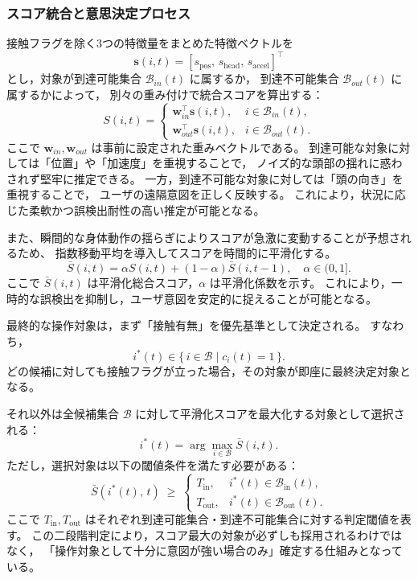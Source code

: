 \documentclass[../../main.tex]{subfiles} %
\begin{document}
\subsubsection{スコア統合と意思決定プロセス}
接触フラグを除く3つの特徴量をまとめた特徴ベクトルを
\begin{equation}
\mathbf{s}(i,t) = [s_{\text{pos}},\,s_{\text{head}},\,s_{\text{accel}}]^\top
\end{equation}
とし，対象が到達可能集合 $\mathcal{B}_{in}(t)$ に属するか，
到達不可能集合 $\mathcal{B}_{out}(t)$ に属するかによって，
別々の重み付けで統合スコアを算出する：
\begin{equation}
S(i,t) =
\begin{cases}
\mathbf{w}_{in}^\top \mathbf{s}(i,t), & i \in \mathcal{B}_{in}(t), \\[6pt]
\mathbf{w}_{out}^\top \mathbf{s}(i,t), & i \in \mathcal{B}_{out}(t).
\end{cases}
\end{equation}
ここで $\mathbf{w}_{in}, \mathbf{w}_{out}$ は事前に設定された重みベクトルである。
到達可能な対象に対しては「位置」や「加速度」を重視することで，
ノイズ的な頭部の揺れに惑わされず堅牢に推定できる。
一方，到達不可能な対象に対しては「頭の向き」を重視することで，
ユーザの遠隔意図を正しく反映する。
これにより，状況に応じた柔軟かつ誤検出耐性の高い推定が可能となる。


また、瞬間的な身体動作の揺らぎによりスコアが急激に変動することが予想されるため、
指数移動平均\cite{EMA}を導入してスコアを時間的に平滑化する。
\begin{equation}
\bar{S}(i,t) = \alpha S(i,t) + (1-\alpha)\bar{S}(i,t-1), \quad \alpha \in (0,1].
\end{equation}
ここで $\bar{S}(i,t)$ は平滑化総合スコア，$\alpha$ は平滑化係数を示す。
これにより，一時的な誤検出を抑制し，ユーザ意図を安定的に捉えることが可能となる。

最終的な操作対象は，まず「接触有無」を優先基準として決定される。
すなわち，
\begin{equation}
  i^*(t) \in \{\, i \in \mathcal{B} \mid c_i(t) = 1 \,\}.
\end{equation}
どの候補に対しても接触フラグが立った場合，その対象が即座に最終決定対象となる。

それ以外は全候補集合 $\mathcal{B}$ に対して平滑化スコアを最大化する対象として選択される：
\begin{equation}
i^*(t) = \arg\max_{i \in \mathcal{B}} \bar{S}(i,t).
\end{equation}
ただし，選択対象は以下の閾値条件を満たす必要がある：
\begin{equation}
  \bar{S}\!\left(i^{*}(t),\,t\right) \;\geq\;
  \begin{cases}
    T_{\text{in}},  & i^{*}(t) \in \mathcal{B}_{\text{in}}(t), \\[6pt]
    T_{\text{out}}, & i^{*}(t) \in \mathcal{B}_{\text{out}}(t).
  \end{cases}
\end{equation}
ここで $T_{\text{in}}, T_{\text{out}}$ はそれぞれ到達可能集合・到達不可能集合に対する判定閾値を表す。
この二段階判定により，スコア最大の対象が必ずしも採用されるわけではなく，
「操作対象として十分に意図が強い場合のみ」確定する仕組みとなっている。
\end{document}

